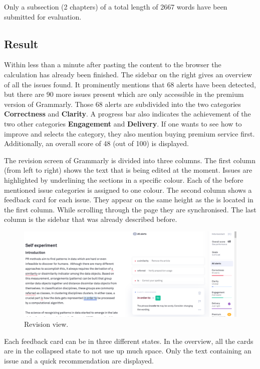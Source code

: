 \documentclass[runningheads]{llncs}
\let\OldTextregistered\textregistered
\renewcommand{\textregistered}{\OldTextregistered\xspace}
\begin{document}
Only a subsection (2 chapters) of a total length of 2667 words have been submitted for evaluation.

\subsection{Result}
Within less than a minute after pasting the content to the browser the calculation has already been finished. The sidebar on the right gives an overview of all the issues found. It prominently mentions that 68 alerts have been detected, but there are 90 more issues present which are only accessible in the premium version of Grammarly\textregistered. Those 68 alerts are subdivided into the two categories \textbf{Correctness} and \textbf{Clarity}. A progress bar also indicates the achievement of the two other categories \textbf{Engagement} and \textbf{Delivery}. If one wants to see how to improve and selects the category, they also mention buying premium service first. Additionally, an overall score of 48 (out of 100) is displayed.

The revision screen of Grammarly\textregistered is divided into three columns. The first column (from left to right) shows the text that is being edited at the moment. Issues are highlighted by underlining the sections in a specific colour. Each of the before mentioned issue categories is assigned to one colour. The second column shows a feedback card for each issue. They appear on the same height as the is located in the first column. While scrolling through the page they are synchronised. The last column is the sidebar that was already described before. 

\begin{figure}[H]
  \includegraphics[width=\linewidth]{images/view.png}
  \caption{Revision view.}
  \label{fig:revision}
\end{figure}

Each feedback card can be in three different states. In the overview, all the cards are in the collapsed state to not use up much space. Only the text containing an issue and a quick recommendation are displayed.
\end{document}
